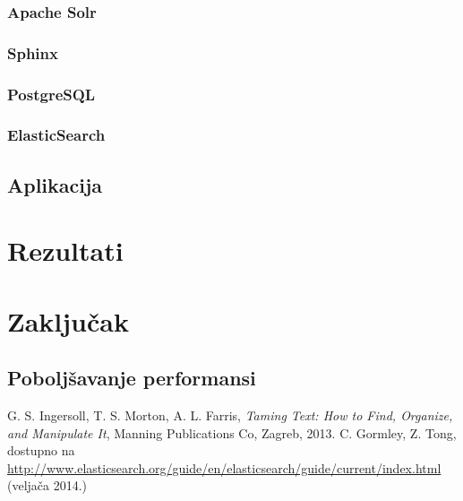 \documentclass[a4paper,twoside,12pt]{scrreprt}
\begin{document}
\subsection{Apache Solr}

\subsection{Sphinx}

\subsection{PostgreSQL}

\subsection{ElasticSearch}

\section{Aplikacija}

\chapter{Rezultati}

\chapter{Zaključak}


\section{Poboljšavanje performansi}


\begin{thebibliography}{99}
   G. S. Ingersoll, T. S. Morton, A. L. Farris, \textit{Taming Text: How to Find, Organize, and Manipulate It}, Manning Publications Co, Zagreb, 2013.
   C. Gormley, Z. Tong, dostupno na \url{http://www.elasticsearch.org/guide/en/elasticsearch/guide/current/index.html} (veljača 2014.)
\end{thebibliography}

\pagestyle{empty}

\begin{sazetak}
\end{sazetak}

\begin{summary}
\end{summary}

\begin{cv}
\end{cv}
\end{document}
